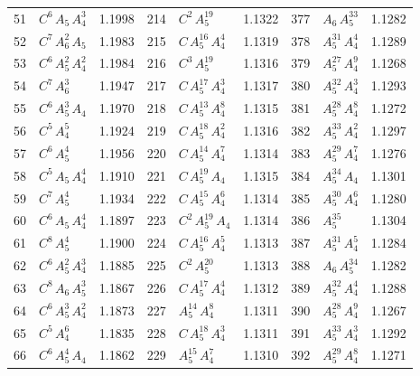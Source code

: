 \begin{longtable}{@{}rlr@{\quad}rlr@{\quad}rlr@{}}
51 & $C^{6}$\,$A_{5}$\,$A_{4}^{3}$ & 1.1998 & 214 & $C^{2}$\,$A_{5}^{19}$ & 1.1322 & 377 & $A_{6}$\,$A_{5}^{33}$ & 1.1282 \\
52 & $C^{7}$\,$A_{6}^{2}$\,$A_{5}$ & 1.1983 & 215 & $C$\,$A_{5}^{16}$\,$A_{4}^{4}$ & 1.1319 & 378 & $A_{5}^{31}$\,$A_{4}^{4}$ & 1.1289 \\
53 & $C^{6}$\,$A_{5}^{2}$\,$A_{4}^{2}$ & 1.1984 & 216 & $C^{3}$\,$A_{5}^{19}$ & 1.1316 & 379 & $A_{5}^{27}$\,$A_{4}^{9}$ & 1.1268 \\
54 & $C^{7}$\,$A_{6}^{3}$ & 1.1947 & 217 & $C$\,$A_{5}^{17}$\,$A_{4}^{3}$ & 1.1317 & 380 & $A_{5}^{32}$\,$A_{4}^{3}$ & 1.1293 \\
55 & $C^{6}$\,$A_{5}^{3}$\,$A_{4}$ & 1.1970 & 218 & $C$\,$A_{5}^{13}$\,$A_{4}^{8}$ & 1.1315 & 381 & $A_{5}^{28}$\,$A_{4}^{8}$ & 1.1272 \\
56 & $C^{5}$\,$A_{4}^{5}$ & 1.1924 & 219 & $C$\,$A_{5}^{18}$\,$A_{4}^{2}$ & 1.1316 & 382 & $A_{5}^{33}$\,$A_{4}^{2}$ & 1.1297 \\
57 & $C^{6}$\,$A_{5}^{4}$ & 1.1956 & 220 & $C$\,$A_{5}^{14}$\,$A_{4}^{7}$ & 1.1314 & 383 & $A_{5}^{29}$\,$A_{4}^{7}$ & 1.1276 \\
58 & $C^{5}$\,$A_{5}$\,$A_{4}^{4}$ & 1.1910 & 221 & $C$\,$A_{5}^{19}$\,$A_{4}$ & 1.1315 & 384 & $A_{5}^{34}$\,$A_{4}$ & 1.1301 \\
59 & $C^{7}$\,$A_{5}^{4}$ & 1.1934 & 222 & $C$\,$A_{5}^{15}$\,$A_{4}^{6}$ & 1.1314 & 385 & $A_{5}^{30}$\,$A_{4}^{6}$ & 1.1280 \\
60 & $C^{6}$\,$A_{5}$\,$A_{4}^{4}$ & 1.1897 & 223 & $C^{2}$\,$A_{5}^{19}$\,$A_{4}$ & 1.1314 & 386 & $A_{5}^{35}$ & 1.1304 \\
61 & $C^{8}$\,$A_{5}^{4}$ & 1.1900 & 224 & $C$\,$A_{5}^{16}$\,$A_{4}^{5}$ & 1.1313 & 387 & $A_{5}^{31}$\,$A_{4}^{5}$ & 1.1284 \\
62 & $C^{6}$\,$A_{5}^{2}$\,$A_{4}^{3}$ & 1.1885 & 225 & $C^{2}$\,$A_{5}^{20}$ & 1.1313 & 388 & $A_{6}$\,$A_{5}^{34}$ & 1.1282 \\
63 & $C^{8}$\,$A_{6}$\,$A_{5}^{3}$ & 1.1867 & 226 & $C$\,$A_{5}^{17}$\,$A_{4}^{4}$ & 1.1312 & 389 & $A_{5}^{32}$\,$A_{4}^{4}$ & 1.1288 \\
64 & $C^{6}$\,$A_{5}^{3}$\,$A_{4}^{2}$ & 1.1873 & 227 & $A_{5}^{14}$\,$A_{4}^{8}$ & 1.1311 & 390 & $A_{5}^{28}$\,$A_{4}^{9}$ & 1.1267 \\
65 & $C^{5}$\,$A_{4}^{6}$ & 1.1835 & 228 & $C$\,$A_{5}^{18}$\,$A_{4}^{3}$ & 1.1311 & 391 & $A_{5}^{33}$\,$A_{4}^{3}$ & 1.1292 \\
66 & $C^{6}$\,$A_{5}^{4}$\,$A_{4}$ & 1.1862 & 229 & $A_{5}^{15}$\,$A_{4}^{7}$ & 1.1310 & 392 & $A_{5}^{29}$\,$A_{4}^{8}$ & 1.1271 \\

\end{longtable}
